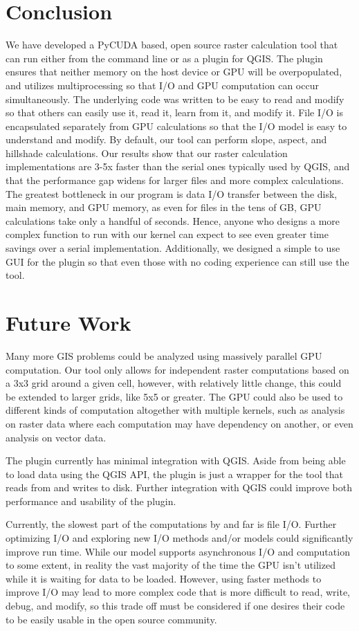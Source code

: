 \documentclass[journal]{IEEEtran}
\begin{document}
\section{Conclusion}
We have developed a PyCUDA based, open source raster calculation tool that can
run either from the command line or as a plugin for QGIS. The plugin ensures
that neither memory on the host device or GPU will be overpopulated, and
utilizes multiprocessing so that I/O and GPU computation can occur
simultaneously. The underlying code was written to be easy to read and modify
so that others can easily use it, read it, learn from it, and modify it. File
I/O is encapsulated separately from GPU calculations so that the I/O model is
easy to understand and modify. By default, our tool can perform slope, aspect,
and hillshade calculations. Our results show that our raster calculation
implementations are 3-5x faster than the serial ones typically used by QGIS, and
that the performance gap widens for larger files and more complex calculations.
The greatest bottleneck in our program is data I/O transfer between the disk,
main memory, and GPU memory, as even for files in the tens of GB, GPU
calculations take only a handful of seconds.  Hence, anyone who designs a more
complex function to run with our kernel can expect to see even greater time
savings over a serial implementation. Additionally, we designed a simple to use
GUI for the plugin so that even those with no coding experience can still use
the tool.

\section{Future Work}
Many more GIS problems could be analyzed using massively parallel GPU
computation.  Our tool only allows for independent raster computations based on
a 3x3 grid around a given cell, however, with relatively little change, this
could be extended to larger grids, like 5x5 or greater.  The GPU could also be
used to different kinds of computation altogether with multiple kernels, such
as analysis on raster data where each computation may have dependency on
another, or even analysis on vector data.

The plugin currently has minimal integration with QGIS. Aside from being able
to load data using the QGIS API, the plugin is just a wrapper for the tool
that reads from and writes to disk. Further integration with QGIS could improve
both performance and usability of the plugin.

Currently, the slowest part of the computations by and far is file I/O. Further
optimizing I/O and exploring new I/O methods and/or models could significantly
improve run time. While our model supports asynchronous I/O and computation to
some extent, in reality the vast majority of the time the GPU isn't utilized
while it is waiting for data to be loaded. However, using faster methods to
improve I/O may lead to more complex code that is more difficult to read,
write, debug, and modify, so this trade off must be considered if one desires
their code to be easily usable in the open source community.
\end{document}
